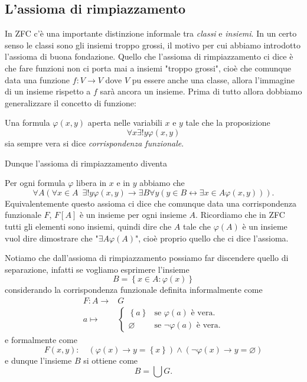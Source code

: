 \documentclass[11pt]{scrartcl}
\begin{document}
	\subsection{L'assioma di rimpiazzamento}
	In ZFC c'è una importante distinzione informale tra \textit{classi} e \textit{insiemi}. In un certo senso le classi sono gli insiemi troppo grossi, il motivo per cui abbiamo introdotto l'assioma di buona fondazione. Quello che l'assioma di rimpiazzamento ci dice è che fare funzioni non ci porta mai a insiemi "troppo grossi", cioè che comunque data una funzione $f:V\to V$ dove $V$ pu essere anche una classe, allora l'immagine di un insieme rispetto a $f$ sarà ancora un insieme. Prima di tutto allora dobbiamo generalizzare il concetto di funzione:
	\begin{definition}
		Una formula $\varphi(x,y)$ aperta nelle variabili $x$ e $y$ tale che la proposizione
		$$\forall x\exists ! y \varphi(x,y) $$
		sia sempre vera si dice \textit{corrispondenza funzionale}.
	\end{definition}
	Dunque l'assioma di rimpiazzamento diventa
	\begin{definition}
		Per ogni formula $\varphi$ libera in $x$ e in $y$ abbiamo che
		$$\forall A \left(\forall x\in A\,\,\,\exists ! y\varphi(x,y)\to \exists B \forall y \left(y\in B \leftrightarrow \exists x\in A \varphi(x,y)\right)\right).$$
		Equivalentemente questo assioma ci dice che comunque data una corrispondenza funzionale $F$, $F[A]$ è un insieme per ogni insieme $A$. Ricordiamo che in ZFC tutti gli elementi sono insiemi, quindi dire che $A$ tale che $\varphi(A)$ è un insieme vuol dire dimostrare che "$\exists A\varphi(A)$", cioè proprio quello che ci dice l'assioma.
	\end{definition}
	Notiamo che dall'assioma di rimpiazzamento possiamo far discendere quello di separazione, infatti se vogliamo esprimere l'insieme
	$$B=\left\{x\in A : \varphi(x)\right\}$$
	considerando la corrispondenza funzionale definita informalmente come
	\begin{align*}
		F:A\to &G \\
		a\mapsto &\begin{cases}
			\left\{a\right\} & \text{se $\varphi(a)$ è vera.} \\
			\varnothing & \text{se $\lnot \varphi(a)$ è vera.}
		\end{cases}
	\end{align*}
	e formalmente come
	$$F(x,y): \quad \left(\varphi(x)\to y=\left\{x\right\}\right) \land \left(\lnot \varphi(x)\to y=\varnothing\right)$$
	e dunque l'insieme $B$ si ottiene come
	$$B=\bigcup G.$$
	
\end{document}
